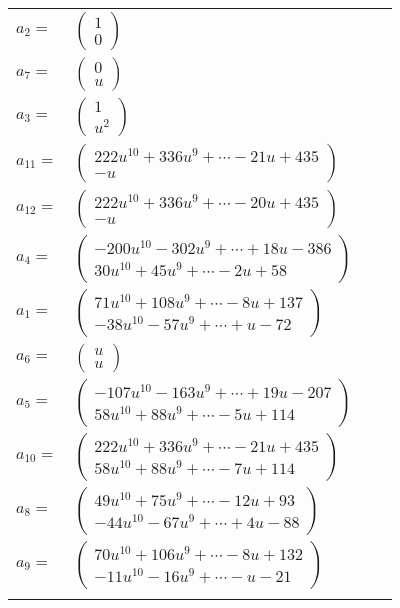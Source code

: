 \documentclass[1p]{elsarticle_modified}
\theoremstyle{definition}
\begin{document}
\begin{tabular}{m{7pt} m{180pt} m{7pt} m{180pt} }
\flushright $a_{2}=$&$\begin{pmatrix}1\\0\end{pmatrix}$ \\
\flushright $a_{7}=$&$\begin{pmatrix}0\\u\end{pmatrix}$ \\
\flushright $a_{3}=$&$\begin{pmatrix}1\\u^2\end{pmatrix}$ \\
\flushright $a_{11}=$&$\begin{pmatrix}222 u^{10}+336 u^9+\cdots-21 u+435\\- u\end{pmatrix}$ \\
\flushright $a_{12}=$&$\begin{pmatrix}222 u^{10}+336 u^9+\cdots-20 u+435\\- u\end{pmatrix}$ \\
\flushright $a_{4}=$&$\begin{pmatrix}-200 u^{10}-302 u^9+\cdots+18 u-386\\30 u^{10}+45 u^9+\cdots-2 u+58\end{pmatrix}$ \\
\flushright $a_{1}=$&$\begin{pmatrix}71 u^{10}+108 u^9+\cdots-8 u+137\\-38 u^{10}-57 u^9+\cdots+u-72\end{pmatrix}$ \\
\flushright $a_{6}=$&$\begin{pmatrix}u\\u\end{pmatrix}$ \\
\flushright $a_{5}=$&$\begin{pmatrix}-107 u^{10}-163 u^9+\cdots+19 u-207\\58 u^{10}+88 u^9+\cdots-5 u+114\end{pmatrix}$ \\
\flushright $a_{10}=$&$\begin{pmatrix}222 u^{10}+336 u^9+\cdots-21 u+435\\58 u^{10}+88 u^9+\cdots-7 u+114\end{pmatrix}$ \\
\flushright $a_{8}=$&$\begin{pmatrix}49 u^{10}+75 u^9+\cdots-12 u+93\\-44 u^{10}-67 u^9+\cdots+4 u-88\end{pmatrix}$ \\
\flushright $a_{9}=$&$\begin{pmatrix}70 u^{10}+106 u^9+\cdots-8 u+132\\-11 u^{10}-16 u^9+\cdots- u-21\end{pmatrix}$\\&\end{tabular}
\end{document}
